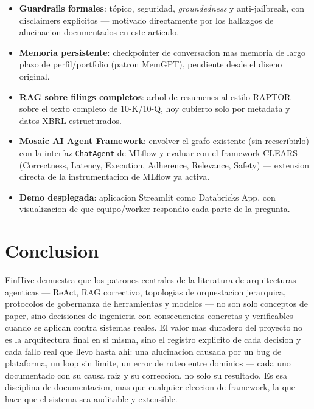 \documentclass[11pt]{article}
\begin{document}
\begin{itemize}[leftmargin=*]
  \item \textbf{Guardrails formales}: tópico, seguridad, \emph{groundedness}
  y anti-jailbreak, con disclaimers explicitos --- motivado directamente por
  los hallazgos de alucinacion documentados en este articulo.
  \item \textbf{Memoria persistente}: checkpointer de conversacion mas
  memoria de largo plazo de perfil/portfolio (patron MemGPT), pendiente
  desde el diseno original.
  \item \textbf{RAG sobre filings completos}: arbol de resumenes al estilo
  RAPTOR sobre el texto completo de 10-K/10-Q, hoy cubierto solo por
  metadata y datos XBRL estructurados.
  \item \textbf{Mosaic AI Agent Framework}: envolver el grafo existente
  (sin reescribirlo) con la interfaz \texttt{ChatAgent} de MLflow y evaluar
  con el framework CLEARS (Correctness, Latency, Execution, Adherence,
  Relevance, Safety) --- extension directa de la instrumentacion de MLflow
  ya activa.
  \item \textbf{Demo desplegada}: aplicacion Streamlit como Databricks App,
  con visualizacion de que equipo/worker respondio cada parte de la
  pregunta.
\end{itemize}

\section{Conclusion}

FinHive demuestra que los patrones centrales de la literatura de
arquitecturas agenticas --- ReAct, RAG correctivo, topologias de
orquestacion jerarquica, protocolos de gobernanza de herramientas y
modelos --- no son solo conceptos de paper, sino decisiones de ingenieria
con consecuencias concretas y verificables cuando se aplican contra sistemas
reales. El valor mas duradero del proyecto no es la arquitectura final en si
misma, sino el registro explicito de cada decision y cada fallo real que
llevo hasta ahi: una alucinacion causada por un bug de plataforma, un loop
sin limite, un error de ruteo entre dominios --- cada uno documentado con su
causa raiz y su correccion, no solo su resultado. Es esa disciplina de
documentacion, mas que cualquier eleccion de framework, la que hace que el
sistema sea auditable y extensible.
\end{document}
